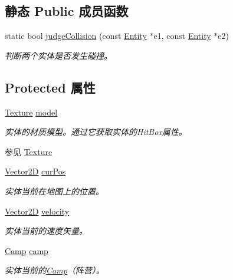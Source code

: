 \subsection*{静态 Public 成员函数}
\begin{DoxyCompactItemize}
\item 
static bool \hyperlink{class_entity_afeab7f54f15446e13fbf218eccb8be53}{judge\+Collision} (const \hyperlink{class_entity}{Entity} $\ast$e1, const \hyperlink{class_entity}{Entity} $\ast$e2)
\begin{DoxyCompactList}\small\item\em 判断两个实体是否发生碰撞。 \end{DoxyCompactList}\end{DoxyCompactItemize}
\subsection*{Protected 属性}
\begin{DoxyCompactItemize}
\item 
\hyperlink{struct_texture}{Texture} \hyperlink{class_entity_a22ccba8fb86e5b4e10b2c33b6f56d238}{model}
\begin{DoxyCompactList}\small\item\em 实体的材质模型。通过它获取实体的\+Hit\+Box属性。\begin{DoxySeeAlso}{参见}
\hyperlink{struct_texture}{Texture}


\end{DoxySeeAlso}
\end{DoxyCompactList}\item 
\hyperlink{structbasic__vector2_d}{Vector2D} \hyperlink{class_entity_a5031aa6b058f2231daad16b35e3d536d}{cur\+Pos}
\begin{DoxyCompactList}\small\item\em 实体当前在地图上的位置。 \end{DoxyCompactList}\item 
\hyperlink{structbasic__vector2_d}{Vector2D} \hyperlink{class_entity_a386d25b56772b8913eb3e5adc636f6e0}{velocity}
\begin{DoxyCompactList}\small\item\em 实体当前的速度矢量。 \end{DoxyCompactList}\item 
\hyperlink{_entity_8h_ad54c4fe39f1c51b786c24ae0b7763b44}{Camp} \hyperlink{class_entity_a5326accd49d3817310ec90692b9da3df}{camp}
\begin{DoxyCompactList}\small\item\em 实体当前的\hyperlink{_entity_8h_ad54c4fe39f1c51b786c24ae0b7763b44}{Camp}（阵营）。 \end{DoxyCompactList}\end{DoxyCompactItemize}


